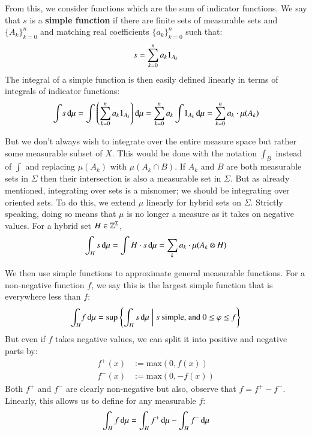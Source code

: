 From this, we consider functions which are the sum of indicator functions.
We say that $s$ is a \textbf{simple function} if there are finite sets of measurable sets and $\{ A_k \}_{k=0}^n$
and matching real coefficients $\{ a_k \}_{k=0}^n$ such that:
\begin{equation*}
	s = \sum_{k=0}^n a_k \ind[A_k]
\end{equation*}
The integral of a simple function is then easily defined linearly in terms of integrals of indicator functions:
\begin{equation*}
	\int \! s \diff \mu 
		= \int \left(\sum_{k=0}^n a_k \ind[A_k] \right) \diff \mu 
		= \sum_{k=0}^n a_k  \int \! \ind[A_k] \diff \mu
		= \sum_{k=0}^n a_k \cdot \mu(A_k)
\end{equation*}

But we don't always wish to integrate over the entire measure space but rather some measurable subset of $X$.
This would be done with the notation $\int_B$ instead of $\int$ and replacing $\mu(A_k)$ with $\mu(A_k \cap B)$.
If $A_k$ and $B$ are both measurable sets in $\Sigma$ then their intersection is also a measurable set in $\Sigma$.
But as already mentioned, integrating over sets is a misnomer; we should be integrating over oriented sets.
To do this, we extend $\mu$ linearly for hybrid sets on $\Sigma$.
Strictly speaking, doing so means that $\mu$ is no longer a measure as it takes on negative values.
For a hybrid set $H \in \hsetover[\Sigma]$,
\begin{equation*}
	\int_H s \mathop{}\!\mathrm{d} \mu = \int H \cdot s \mathop{}\!\mathrm{d} \mu = \sum_k a_k \cdot \mu(A_k \otimes H)
\end{equation*}


We then use simple functions to approximate general measurable functions.
For a non-negative function $f$, we say this is the largest simple function that is everywhere less than $f$:
\begin{equation*}
	\int_H \! f \mathop{}\!\mathrm{d}\mu = 
		\text{sup} \left\{ 
			\int_H s \mathop{}\!\mathrm{d} \mu \;\middle|\; s \text{ simple, and } 0 \leq \varphi \leq f 
		\right\}
\end{equation*}
But even if $f$ takes negative values, we can split it into positive and negative parts by:
\begin{align*}
f^+(x) &:= \mathrm{max}( 0, f(x)) \\
f^-(x) &:= \mathrm{max}(0, -f(x)) 
\end{align*}
Both $f^+$ and $f^-$ are clearly non-negative but also, observe that $f=f^+ - f^-$.
Linearly, this allows us to define for any measurable $f$:
\begin{equation*}
\int_H f \mathop{}\!\mathrm{d} \mu = \int_H f^+ \mathop{}\!\mathrm{d} \mu - \int_H f^- \mathop{}\!\mathrm{d} \mu
\end{equation*}


